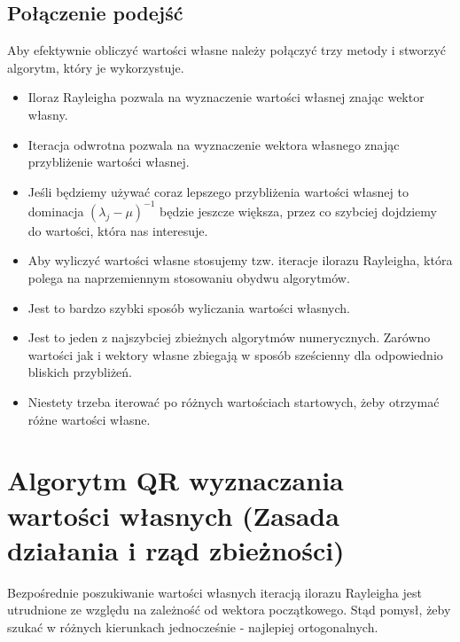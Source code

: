 \documentclass[a4paper]{article}
\begin{document}
\subsection{Połączenie podejść}
Aby efektywnie obliczyć wartości własne należy połączyć trzy metody i stworzyć algorytm, który je wykorzystuje.
\begin{itemize}
    \item Iloraz Rayleigha pozwala na wyznaczenie wartości własnej znając wektor własny.
    \item Iteracja odwrotna pozwala na wyznaczenie wektora własnego znając przybliżenie wartości własnej.
    \item Jeśli będziemy używać coraz lepszego przybliżenia wartości własnej to dominacja $(\lambda_j - \mu)^{-1}$ będzie jeszcze większa, przez co szybciej dojdziemy do wartości, która nas interesuje.
    \item Aby wyliczyć wartości własne stosujemy tzw. iteracje ilorazu Rayleigha, która polega na naprzemiennym stosowaniu obydwu algorytmów.
    \item Jest to bardzo szybki sposób wyliczania wartości własnych.
    \item Jest to jeden z najszybciej zbieżnych algorytmów numerycznych. Zarówno wartości jak i wektory własne zbiegają w sposób sześcienny dla odpowiednio bliskich przybliżeń.
    \item Niestety trzeba iterować po różnych wartościach startowych, żeby otrzymać różne wartości własne.
\end{itemize}

\section{Algorytm QR wyznaczania wartości własnych (Zasada działania i rząd zbieżności)}
Bezpośrednie poszukiwanie wartości własnych iteracją ilorazu Rayleigha jest utrudnione ze względu na zależność od wektora początkowego. Stąd pomysł, żeby szukać w różnych kierunkach jednocześnie - najlepiej ortogonalnych.
\end{document}
